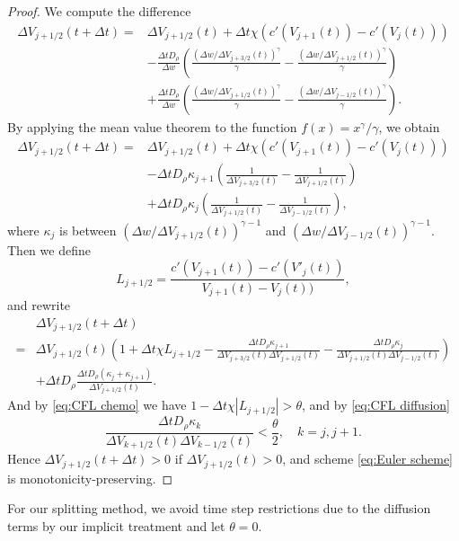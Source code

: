 \documentclass{article}
\begin{document}
  \begin{proof}
  We compute the difference
    \[
      \begin{aligned}
        \Delta V_{j + 1 / 2}(t + \Delta t) =& \Delta V_{j + 1 / 2}(t)
          + \Delta t\chi\left(c'(V_{j + 1}(t)) - c'(V_j(t))\right) \\
          &- \frac{\Delta tD_\rho}{\Delta w}\left(
              \frac{\left(\Delta w / \Delta V_{j + 3 / 2}(t)\right)^\gamma}{\gamma}
              - \frac{\left(\Delta w / \Delta V_{j + 1 / 2}(t)\right)^\gamma}{\gamma}
            \right) \\
          &+ \frac{\Delta tD_\rho}{\Delta w}\left(
              \frac{\left(\Delta w / \Delta V_{j + 1 / 2}(t)\right)^\gamma}{\gamma}
              - \frac{\left(\Delta w / \Delta V_{j - 1 / 2}(t)\right)^\gamma}{\gamma}
            \right).
      \end{aligned}
    \]
    By applying the mean value theorem to the function $f(x) = x^\gamma / \gamma$,
    we obtain
    \[
      \begin{aligned}
        \Delta V_{j + 1 / 2}(t + \Delta t) =& \Delta V_{j + 1 / 2}(t)
          + \Delta t\chi\left(c'(V_{j + 1}(t)) - c'(V_j(t))\right) \\
          &- \Delta tD_\rho\kappa_{j + 1}\left(
            \frac 1{\Delta V_{j + 3 / 2}(t)} - \frac 1{\Delta V_{j + 1 / 2}(t)}
            \right) \\
          &+ \Delta tD_\rho\kappa_j\left(
            \frac 1{\Delta V_{j + 1 / 2}(t)} - \frac 1{\Delta V_{j - 1 / 2}(t)}
            \right),
      \end{aligned}
    \]
    where $\kappa_j$ is between $\left(\Delta w / \Delta V_{j + 1 / 2}(t)\right)^{\gamma - 1}$
    and $\left(\Delta w / \Delta V_{j - 1 / 2}(t)\right)^{\gamma - 1}$.
    Then we define
    \[
      L_{j + 1 / 2} = \frac{c'(V_{j + 1}(t)) - c'(V'_j(t))}{V_{j + 1}(t) - V_j(t))},
    \]
    and rewrite
    \[
      \begin{aligned}
         &\Delta V_{j + 1 / 2}(t + \Delta t)\\
        =& \Delta V_{j + 1 / 2}(t)
        \left(
          1 + \Delta t\chi L_{j + 1 / 2}
          - \frac{\Delta t D_\rho\kappa_{j + 1}}{\Delta V_{j + 3 / 2}(t)\Delta V_{j + 1 / 2}(t)}
          - \frac{\Delta t D_\rho\kappa_j}{\Delta V_{j + 1 / 2}(t)\Delta V_{j - 1 / 2}(t)}
        \right)\\
         &+ \Delta t D_\rho\frac{\Delta t D_\rho(\kappa_j + \kappa_{j + 1})}{\Delta V_{j + 1 / 2}(t)}.
      \end{aligned}
    \]
    And by \cref{eq:CFL chemo} we have $1 - \Delta t\chi\left|L_{j + 1 / 2}\right| > \theta$,
    and by \cref{eq:CFL diffusion}
    \[
      \frac{\Delta t D_\rho \kappa_k}{\Delta V_{k + 1 / 2}(t)\Delta V_{k - 1 / 2}(t)}
      < \frac\theta 2,\quad k = j, j + 1.
    \]
    Hence $\Delta V_{j + 1 / 2}(t + \Delta t) > 0$ if $\Delta V_{j + 1 / 2}(t) > 0$, and scheme
    \ref{eq:Euler scheme} is monotonicity-preserving.
  \end{proof}

  For our splitting method, we avoid time step restrictions due to the diffusion terms by our
  implicit treatment and let $\theta = 0$.
\end{document}
